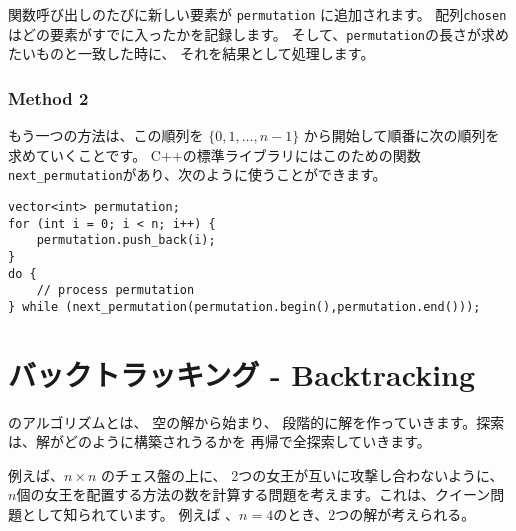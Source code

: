 関数呼び出しのたびに新しい要素が
\texttt{permutation}
に追加されます。
配列\texttt{chosen} はどの要素がすでに入ったかを記録します。
そして、\texttt{permutation}の長さが求めたいものと一致した時に、
それを結果として処理します。

\subsubsection{Method 2}


もう一つの方法は、この順列を
$\{0,1,\ldots,n-1\}$ から開始して順番に次の順列を求めていくことです。
C++の標準ライブラリにはこのための関数
\texttt{next\_permutation}があり、次のように使うことができます。

\begin{lstlisting}
vector<int> permutation;
for (int i = 0; i < n; i++) {
    permutation.push_back(i);
}
do {
    // process permutation
} while (next_permutation(permutation.begin(),permutation.end()));
\end{lstlisting}

\section{バックトラッキング - Backtracking}


 のアルゴリズムとは、
空の解から始まり、
段階的に解を作っていきます。探索は、解がどのように構築されうるかを
再帰で全探索していきます。


例えば、$n \times n$ のチェス盤の上に、
2つの女王が互いに攻撃し合わないように、
$n$個の女王を配置する方法の数を計算する問題を考えます。これは、クイーン問題として知られています。
例えば 、$n=4$のとき、2つの解が考えられる。

\begin{center}
\end{center}


